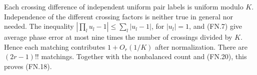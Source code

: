 Each crossing difference of independent uniform pair labels is uniform modulo \(K\). Independence of the different crossing factors is neither true in general nor needed. The inequality \(|\prod_l u_l-1|\leq\sum_l|u_l-1|\), for \(|u_l|=1\), and (FN.7) give average phase error at most nine times the number of crossings divided by \(K\). Hence each matching contributes \(1+O_r(1/K)\) after normalization. There are \((2r-1)!!\) matchings. Together with the nonbalanced count and (FN.20), this proves (FN.18).


